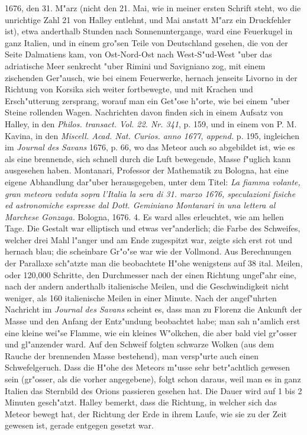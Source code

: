 \documentclass[a4paper, 11pt, oneside, polutonikogreek, german]{article}
\begin{document}
1676, den 31. M"arz (nicht den 21. Mai, wie in meiner ersten Schrift steht, wo die unrichtige Zahl 21 von Halley entlehnt, und Mai anstatt M"arz ein Druckfehler ist), etwa anderthalb Stunden nach Sonnenuntergange, ward eine Feuerkugel in ganz Italien, und in einem gro"sen Teile von Deutschland gesehen, die von der Seite Dalmatiens kam, von Ost-Nord-Ost nach West-S"ud-West "uber das adriatische Meer senkrecht "uber Rimini und Savigniano zog, mit einem zischenden Ger"ausch, wie bei einem Feuerwerke, hernach jenseits Livorno in der Richtung von Korsika sich weiter fortbewegte, und mit Krachen und Ersch"utterung zersprang, worauf man ein Get"ose h"orte, wie bei einem "uber Steine rollenden Wagen. Nachrichten davon finden sich in einem Aufsatz von Halley, in den \emph{Philos. transact. Vol. 22. Nr. 341}, p. 159, und in einem von P. M. Kavina, in den \emph{Miscell. Acad. Nat. Curios. anno 1677, append.} p. 195, ingleichen im \emph{Journal des Savans} 1676, p. 66, wo das Meteor auch so abgebildet ist, wie es als eine brennende, sich schnell durch die Luft bewegende, Masse f"uglich kann ausgesehen haben. Montanari, Professor der Mathematik zu Bologna, hat eine eigene Abhandlung dar"uber herausgegeben, unter dem Titel: \emph{La fiamma volante, gran meteora veduta sopra l'Italia la sera di 31. marzo 1676, speculazioni fisiche ed astronomiche espresse dal Dott. Geminiano Montanari in una lettera al Marchese Gonzaga.} Bologna, 1676. 4. Es ward alles erleuchtet, wie am hellen Tage. Die Gestalt war elliptisch und etwas ver"anderlich; die Farbe des Schweifes, welcher drei Mahl l"anger und am Ende zugespitzt war, zeigte sich erst rot und hernach blau; die scheinbare Gr"o"se war wie der Vollmond. Aus Berechnungen der Parallaxe sch"atzte man die beobachtete H"ohe wenigstens auf 38 ital. Meilen, oder 120,000 Schritte, den Durchmesser nach der einen Richtung ungef"ahr eine, nach der andern anderthalb italienische Meilen, und die Geschwindigkeit nicht weniger, als 160 italienische Meilen in einer Minute. Nach der angef"uhrten Nachricht im \emph{Journal des Savans} scheint es, dass man zu Florenz die Ankunft der Masse und den Anfang der Entz"undung beobachtet habe; man sah n"amlich erst eine kleine wei"se Flamme, wie ein kleines W"olkchen, die aber bald viel gr"osser und gl"anzender ward. Auf den Schweif folgten schwarze Wolken (aus dem Rauche der brennenden Masse bestehend), man versp"urte auch einen Schwefelgeruch. Dass die H"ohe des Meteors m"usse sehr betr"achtlich gewesen sein (gr"osser, als die vorher angegebene), folgt schon daraus, weil man es in ganz Italien das Sternbild des Orions passieren gesehen hat. Die Dauer wird auf 1 bis 2 Minuten gesch"atzt. Halley bemerkt, dass die Richtung, in welcher sich das Meteor bewegt hat, der Richtung der Erde in ihrem Laufe, wie sie zu der Zeit gewesen ist, gerade entgegen gesetzt war.
\end{document}
